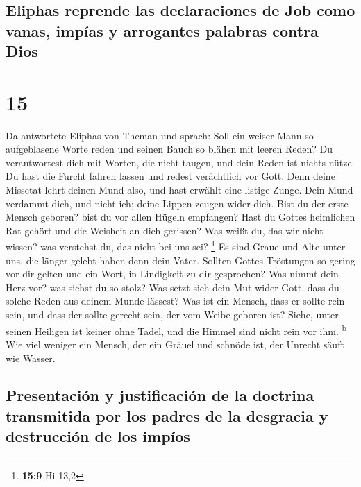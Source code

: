 \hypertarget{eliphas-reprende-las-declaraciones-de-job-como-vanas-impuxedas-y-arrogantes-palabras-contra-dios}{%
\subsection{Eliphas reprende las declaraciones de Job como vanas, impías
y arrogantes palabras contra
Dios}\label{eliphas-reprende-las-declaraciones-de-job-como-vanas-impuxedas-y-arrogantes-palabras-contra-dios}}

\hypertarget{section-14}{%
\section{15}\label{section-14}}

 Da antwortete Eliphas von Theman und sprach:
 Soll ein weiser Mann so aufgeblasene Worte reden und
seinen Bauch so blähen mit leeren Reden?  Du verantwortest
dich mit Worten, die nicht taugen, und dein Reden ist nichts nütze.
 Du hast die Furcht fahren lassen und redest verächtlich
vor Gott.  Denn deine Missetat lehrt deinen Mund also, und
hast erwählt eine listige Zunge.  Dein Mund verdammt dich,
und nicht ich; deine Lippen zeugen wider dich.  Bist du
der erste Mensch geboren? bist du vor allen Hügeln empfangen?
 Hast du Gottes heimlichen Rat gehört und die Weisheit an
dich gerissen?  Was weißt du, das wir nicht wissen? was
verstehst du, das nicht bei uns sei? \footnote{\textbf{15:9} Hi 13,2}
 Es sind Graue und Alte unter uns, die länger gelebt
haben denn dein Vater.  Sollten Gottes Tröstungen so
gering vor dir gelten und ein Wort, in Lindigkeit zu dir gesprochen?
 Was nimmt dein Herz vor? was siehst du so stolz?
 Was setzt sich dein Mut wider Gott, dass du solche Reden
aus deinem Munde lässest?  Was ist ein Mensch, dass er
sollte rein sein, und dass der sollte gerecht sein, der vom Weibe
geboren ist?  Siehe, unter seinen Heiligen ist keiner
ohne Tadel, und die Himmel sind nicht rein vor ihm. \textsuperscript{b}
 Wie viel weniger ein Mensch, der ein Gräuel und schnöde
ist, der Unrecht säuft wie Wasser.

\hypertarget{presentaciuxf3n-y-justificaciuxf3n-de-la-doctrina-transmitida-por-los-padres-de-la-desgracia-y-destrucciuxf3n-de-los-impuxedos}{%
\subsection{Presentación y justificación de la doctrina transmitida por
los padres de la desgracia y destrucción de los
impíos}\label{presentaciuxf3n-y-justificaciuxf3n-de-la-doctrina-transmitida-por-los-padres-de-la-desgracia-y-destrucciuxf3n-de-los-impuxedos}}


